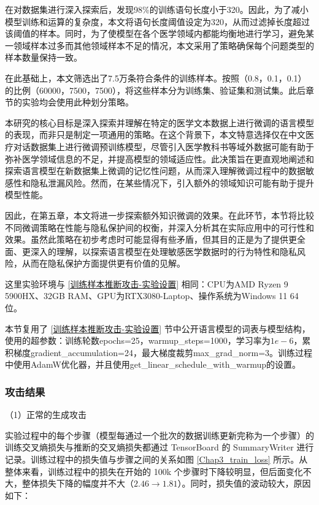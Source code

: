 在对数据集进行深入探索后，发现98\%的训练语句长度小于320。因此，为了减小模型训练和运算的复杂度，本文将语句长度阈值设定为320，从而过滤掉长度超过该阈值的样本。同时，为了使模型在各个医学领域内都能均衡地进行学习，避免某一领域样本过多而其他领域样本不足的情况，本文采用了策略确保每个问题类型的样本数量保持一致。

在此基础上，本文筛选出了7.5万条符合条件的训练样本。按照（0.8，0.1，0.1）的比例（60000，7500，7500），将这些样本分为训练集、验证集和测试集。此后章节的实验均会使用此种划分策略。

本研究的核心目标是深入探索并理解在特定的医学文本数据上进行微调的语言模型的表现，而非只是制定一项通用的策略。在这个背景下，本文特意选择仅在中文医疗对话数据集上进行微调预训练模型，尽管引入医学教科书等域外数据可能有助于弥补医学领域信息的不足，并提高模型的领域适应性。此决策旨在更直观地阐述和探索语言模型在新数据集上微调的记忆性问题，从而深入理解微调过程中的数据敏感性和隐私泄漏风险。然而，在某些情况下，引入额外的领域知识可能有助于提升模型性能。

因此，在第五章，本文将进一步探索额外知识微调的效果。在此环节，本节将比较不同微调策略在性能与隐私保护间的权衡，并深入分析其在实际应用中的可行性和效果。虽然此策略在初步考虑时可能显得有些矛盾，但其目的正是为了提供更全面、更深入的理解，以探索语言模型在处理敏感医学数据时的行为特性和隐私风险，从而在隐私保护方面提供更有价值的见解。

这里实验环境与 \ref{训练样本推断攻击-实验设置} 相同：CPU为AMD Ryzen 9 5900HX、32GB RAM、GPU为RTX3080-Laptop、操作系统为Windows 11 64位。

本节复用了 \ref{训练样本推断攻击-实验设置} 节中公开语言模型的词表与模型结构，使用的超参数：训练轮数epochs=25，warmup\_steps=1000，学习率为$1e-6$，累积梯度gradient\_accumulation=24，最大梯度裁剪max\_grad\_norm=3。训练过程中使用AdamW优化器，并且使用get\_linear\_schedule\_with\_warmup的设置。


\subsubsection{攻击结果}

（1）正常的生成攻击


实验过程中的每个步骤（模型每通过一个批次的数据训练更新完称为一个步骤）的训练交叉熵损失与推断的交叉熵损失都通过 TensorBoard 的 SummaryWriter\cite{tensorflow} 进行记录。训练过程中的损失值与步骤之间的关系如图 \ref{Chap3_train_loss} 所示。从整体来看，训练过程中的损失在开始的 100k 个步骤时下降较明显，但后面变化不大，整体损失下降的幅度并不大（$2.46\rightarrow 1.81$）。同时，损失值的波动较大，原因如下：

